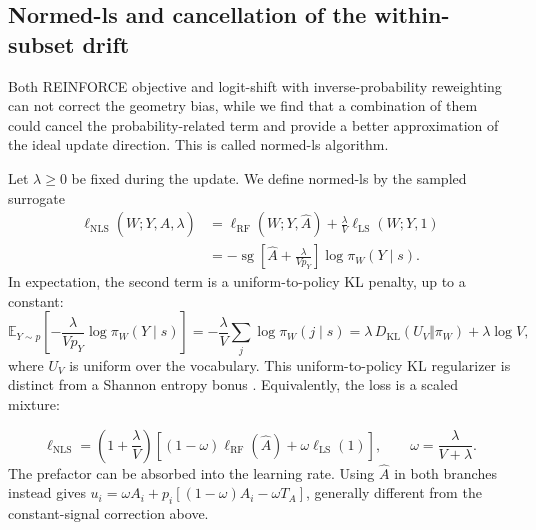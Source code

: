 \subsection{Normed-ls and cancellation of the within-subset drift}
\label{app:dynamics-normed-ls}

\begin{insight}
  Both REINFORCE objective and logit-shift with inverse-probability reweighting can not correct the geometry bias, while we find that a combination of them could cancel the probability-related term and provide a better approximation of the ideal update direction. This is called normed-ls algorithm.
\end{insight}

Let $\lambda\ge0$ be fixed during the update. We define normed-ls by
the sampled surrogate
\begin{align}
 \ell_{\mathrm{NLS}}(W;Y,\widehat A,\lambda)
 &=\ell_{\mathrm{RF}}(W;Y,\widehat A)
       +\frac{\lambda}{V}\ell_{\mathrm{LS}}(W;Y,1) \nonumber\\
 &=-\operatorname{sg}\left[\widehat A+\frac{\lambda}{Vp_Y}\right]
                  \log\pi_W(Y\mid s).
 \label{eq:dyn-nls-loss}
\end{align}
In expectation, the second term is a uniform-to-policy KL penalty,
up to a constant:
\begin{equation}
 \mathbb E_{Y\sim p}\left[
       -\frac{\lambda}{Vp_Y}\log\pi_W(Y\mid s)\right]
 =-\frac{\lambda}{V}\sum_j\log\pi_W(j\mid s)
 =\lambda\,D_{\mathrm{KL}}(U_V\Vert\pi_W)+\lambda\log V,
 \label{eq:dyn-barrier-identity}
\end{equation}
where $U_V$ is uniform over the vocabulary. This uniform-to-policy KL
regularizer is distinct from a Shannon entropy bonus
\citep{agarwal2021policygradient}. Equivalently, the loss is a scaled mixture:

\begin{equation}
 \ell_{\mathrm{NLS}}
 =\left(1+\frac{\lambda}{V}\right)
   \left[(1-\omega)\ell_{\mathrm{RF}}(\widehat A)
               +\omega\ell_{\mathrm{LS}}(1)\right],
 \qquad \omega=\frac{\lambda}{V+\lambda}.
 \label{eq:dyn-nls-mixture}
\end{equation}
The prefactor can be absorbed into the learning rate. Using $\widehat A$
in both branches instead gives
$u_i=\omega A_i+p_i[(1-\omega)A_i-\omega T_A]$, generally different
from the constant-signal correction above.


